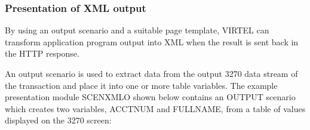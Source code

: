 \documentclass[letterpaper,10pt,english]{sphinxmanual}
\begin{document}
\begin{sphinxVerbatim}[commandchars=\\\{\}]
  
 
  

  
 
 
\end{sphinxVerbatim}



\subsubsection{Presentation of XML output}
\label{\detokenize{User_Guide:presentation-of-xml-output}}
By using an output scenario and a suitable page template, VIRTEL can transform application program output into XML when the result is sent back in the HTTP response.


An output scenario is used to extract data from the output 3270 data stream of the transaction and place it into one or
more table variables. The example presentation module SCENXMLO shown below contains an OUTPUT scenario which
creates two variables, ACCTNUM and FULLNAME, from a table of values displayed on the 3270 screen:
\end{document}
